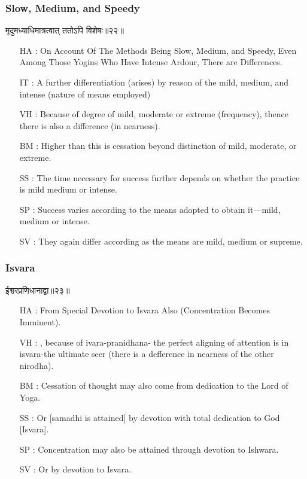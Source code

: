 \begin{frame}[fragile]\frametitle{Slow, Medium, and Speedy}
\begin{sanskrit}
मृदुमध्याधिमात्रत्वात् ततोऽपि विशेषः॥२२॥
\end{sanskrit}

	\begin{itemize}
	\item [HA]: On Account Of The Methods Being Slow, Medium, and Speedy, Even Among Those Yogins Who Have Intense Ardour, There are Differences.
	\item [IT]: A further differentiation (arises) by reason of the mild, medium, and intense (nature of means employed)
	\item [VH]: Because of degree of mild, moderate or extreme (frequency), thence there is also a difference (in nearness).
	\item [BM]: Higher than this is cessation beyond distinction of mild, moderate, or extreme.
	\item [SS]: The time necessary for success further depends on whether the practice is mild medium or intense.
	\item [SP]: Success varies according to the means adopted to obtain it—mild, medium or intense.
	\item [SV]: They again differ according as the means are mild, medium or supreme. 
	\end{itemize}
\end{frame}


\begin{frame}[fragile]\frametitle{Isvara}
\begin{sanskrit}
ईश्वरप्रणिधानाद्वा॥२३॥
\end{sanskrit}

	\begin{itemize}
	\item [HA]: From Special Devotion to Isvara Also (Concentration Becomes Imminent).
	\item [VH]: , because of ivara-pranidhana- the perfect aligning of attention is in isvara-the ultimate seer (there is a defference in nearness of the other nirodha).
	\item [BM]: Cessation of thought may also come from dedication to the Lord of Yoga.
	\item [SS]: Or [samadhi is attained] by devotion with total dedication to God [Isvara].
	\item [SP]: Concentration may also be attained through devotion to Ishwara.
	\item [SV]: Or by devotion to Isvara. 
	\end{itemize}
\end{frame}

